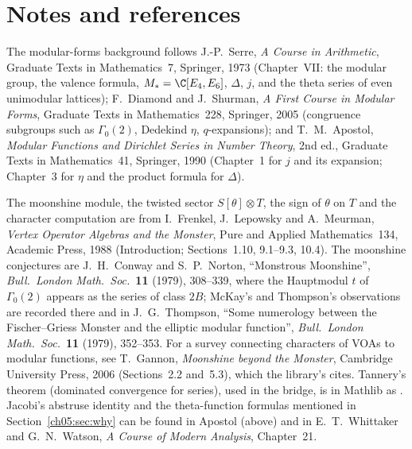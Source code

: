 \section{Notes and references}\label{ch05:sec:notes}

The modular-forms background follows J.-P.~Serre, \emph{A Course in Arithmetic}, Graduate Texts in
Mathematics~7, Springer, 1973 (Chapter~VII: the modular group, the valence formula, $M_* =
\C[E_4,E_6]$, $\Delta$, $j$, and the theta series of even unimodular lattices); F.~Diamond and J.~Shurman,
\emph{A First Course in Modular Forms}, Graduate Texts in Mathematics~228, Springer, 2005 (congruence
subgroups such as $\Gamma_0(2)$, Dedekind $\eta$, $q$-expansions); and T.~M.~Apostol, \emph{Modular
Functions and Dirichlet Series in Number Theory}, 2nd ed., Graduate Texts in Mathematics~41, Springer,
1990 (Chapter~1 for $j$ and its expansion; Chapter~3 for $\eta$ and the product formula for $\Delta$).

The moonshine module, the twisted sector $S[\theta]\otimes T$, the sign of $\theta$ on $T$ and the character
computation are from I.~Frenkel, J.~Lepowsky and A.~Meurman, \emph{Vertex Operator Algebras and the
Monster}, Pure and Applied Mathematics~134, Academic Press, 1988 (Introduction; Sections~1.10, 9.1--9.3,
10.4). The moonshine conjectures are J.~H.~Conway and S.~P.~Norton, ``Monstrous Moonshine'',
\emph{Bull.\ London Math.\ Soc.}\ \textbf{11} (1979), 308--339, where the Hauptmodul $t$ of $\Gamma_0(2)$
appears as the series of class $2B$; McKay's and Thompson's observations are recorded there and in
J.~G.~Thompson, ``Some numerology between the Fischer--Griess Monster and the elliptic modular
function'', \emph{Bull.\ London Math.\ Soc.}\ \textbf{11} (1979), 352--353. For a survey connecting
characters of VOAs to modular functions, see T.~Gannon, \emph{Moonshine beyond the Monster},
Cambridge University Press, 2006 (Sections~2.2 and~5.3), which the library's 
cites. Tannery's theorem (dominated convergence for series), used in the bridge, is in Mathlib as
. Jacobi's abstruse identity and the theta-function
formulas mentioned in Section~\ref{ch05:sec:why} can be found in Apostol (above) and in E.~T.~Whittaker and
G.~N.~Watson, \emph{A Course of Modern Analysis}, Chapter~21.
